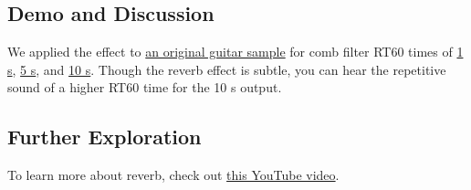 \subsection{Demo and Discussion}
We applied the effect to \href{run:../InputAudio/22-004 Original Guitar.wav}{an original guitar sample} for comb filter RT60 times of \href{run:../OutputAudio/schroeder_22-004 Original Guitar_{RT60=1s}.wav}{1 s}, \href{run:../OutputAudio/schroeder_22-004 Original Guitar_{RT60=5s}.wav}{5 s}, and \href{run:../OutputAudio/schroeder_22-004 Original Guitar_{RT60=10s}.wav}{10 s}. Though the reverb effect is subtle, you can hear the repetitive sound of a higher RT60 time for the 10 s output.

\subsection{Further Exploration}
To learn more about reverb, check out \href{https://www.youtube.com/watch?v=TZG2K0J_A3c}{this YouTube video}.